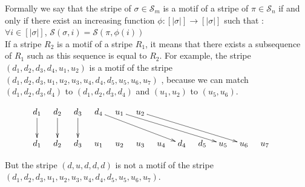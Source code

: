 \documentclass[12pt, a4paper]{article}
\newcommand{\C}[1]{A_{#1}(231,213)}
\newcommand{\Perm}[1]{\mathcal{S}_{#1}}
\newcommand{\ptext}{\pi}
\newcommand{\pmotif}{\sigma}
\newcounter{num}
\newcommand{\num}{\stepcounter{num} }
\newcommand{\numl}[1]{\refstepcounter{num}\label{#1}}
\newcommand{\dstep}{d}
\newcommand{\ustep}{u}
\begin{document}
	  			 		  	
		

		
		Formally we say that the stripe of $\pmotif \in \Perm{m}$ is a motif
		of a stripe of $\ptext \in \Perm{n}$ if and only if there exist an increasing function $\phi : [|\pmotif|] \rightarrow [|\pmotif|]$
		such that : \\
		$\forall i \in [|\pmotif|]$, $\mathcal{S}(\pmotif,i) = \mathcal{S}(\ptext,\phi(i))$\\
		If a stripe $R_2$ is a motif of a stripe $R_1$,
		it means that there exists
		a subsequence of $R_1$ such as
		this sequence is equal to $R_2$.
		For example, the stripe $(\dstep_1,\dstep_2,\dstep_3,\dstep_4,\ustep_1,\ustep_2)$ is a motif of  the stripe \\
		$(\dstep_1,\dstep_2,\dstep_3,\ustep_1,\ustep_2,\ustep_3,\ustep_4,\dstep_4,\dstep_5,\ustep_5,\ustep_6,\ustep_7)$ ,
		because we can match \\
		$(\dstep_1,\dstep_2,\dstep_3,\dstep_4)$ to $(\dstep_1,\dstep_2,\dstep_3,\dstep_4)$ and $(\ustep_1,\ustep_2)$ to 
		$(\ustep_5,\ustep_6)$.
		\begin{figure}[h!]
			\begin{displaymath}
				\xymatrix@=0.3cm{
					\dstep_1 \ar[dd] & \dstep_2 \ar[dd] & \dstep_3 \ar[dd] & \dstep_4\ar[ddrrrr]  & \ustep_1 \ar[ddrrrrr]& \ustep_2 \ar[ddrrrrr]  \\
					\\
					\dstep_1 & \dstep_2 & \dstep_3 & \ustep_1 & \ustep_2 & \ustep_3 & \ustep_4 & \dstep_4 & \dstep_5 & \ustep_5 & \ustep_6 & \ustep_7 & \\
				}
			\end{displaymath}     
		\end{figure}		
		But the stripe $(\dstep,\ustep,\dstep,\dstep,\dstep)$ is not a motif of the stripe\\ $(\dstep_1,\dstep_2,\dstep_3,\ustep_1,\ustep_2,\ustep_3,\ustep_4,\dstep_4,\dstep_5,\ustep_5,\ustep_6,\ustep_7)$.\\
		
\end{document}
